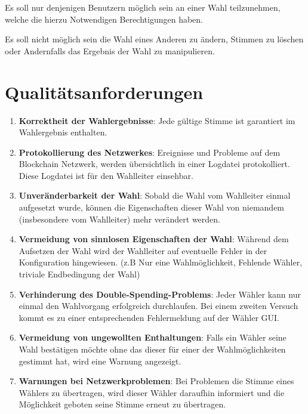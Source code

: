 \documentclass[parskip=full,11pt,twoside]{scrartcl}
\begin{document}
Es soll nur denjenigen Benutzern möglich sein an einer Wahl teilzunehmen, welche die hierzu Notwendigen Berechtigungen haben.

Es soll nicht möglich sein die Wahl eines Anderen zu ändern, Stimmen zu löschen oder Andernfalls das Ergebnis der Wahl zu manipulieren.

\section{Qualitätsanforderungen}
\begin{enumerate}
	\item \textbf{Korrektheit der Wahlergebnisse}: Jede gültige Stimme ist garantiert im Wahlergebnis enthalten.
	\item \textbf{Protokollierung des Netzwerkes}: Ereignisse und Probleme auf dem Blockchain Netzwerk, werden übersichtlich in einer Logdatei protokolliert. Diese Logdatei ist für den Wahlleiter einsehbar.
	\item \textbf{Unveränderbarkeit der Wahl}: Sobald die Wahl vom Wahlleiter einmal aufgesetzt wurde, können die Eigenschaften dieser Wahl von niemandem (insbesondere vom Wahlleiter) mehr verändert werden.
	\item \textbf{Vermeidung von sinnlosen Eigenschaften der Wahl}: Während dem Aufsetzen der Wahl wird der Wahlleiter auf eventuelle Fehler in der Konfiguration hingewiesen. (z.B Nur eine Wahlmöglichkeit, Fehlende Wähler, triviale Endbedingung der Wahl)
	\item \textbf{Verhinderung des Double-Spending-Problems}: Jeder Wähler kann nur einmal den Wahlvorgang erfolgreich durchlaufen. Bei einem zweiten Versuch kommt es zu einer entsprechenden Fehlermeldung auf der Wähler GUI.
	\item \textbf{Vermeidung von ungewollten Enthaltungen}: Falls ein Wähler seine Wahl bestätigen möchte ohne das dieser für einer der Wahlmöglichkeiten gestimmt hat, wird eine Warnung angezeigt.
	\item \textbf{Warnungen bei Netzwerkproblemen}: Bei Problemen die Stimme eines Wählers zu übertragen, wird dieser Wähler daraufhin informiert und die Möglichkeit geboten seine Stimme erneut zu übertragen. 
\end{enumerate}
\end{document}
